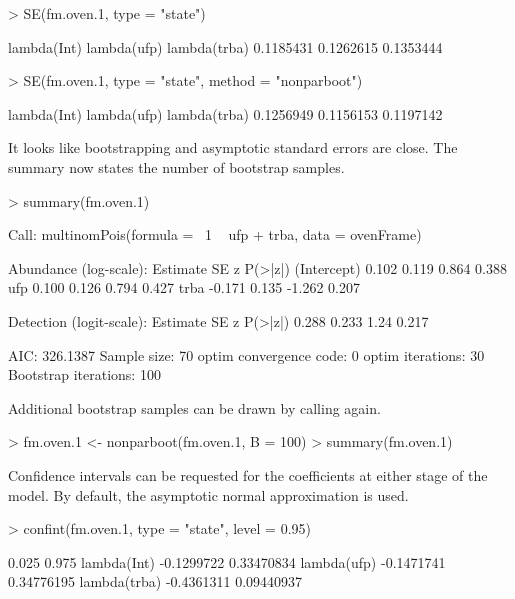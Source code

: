 \documentclass[article,shortnames]{jss}
\begin{document}
\begin{Schunk}
\begin{Sinput}
> SE(fm.oven.1, type = "state")
\end{Sinput}
\begin{Soutput}
 lambda(Int)  lambda(ufp) lambda(trba) 
   0.1185431    0.1262615    0.1353444 
\end{Soutput}
\begin{Sinput}
> SE(fm.oven.1, type = "state", method = "nonparboot")
\end{Sinput}
\begin{Soutput}
 lambda(Int)  lambda(ufp) lambda(trba) 
   0.1256949    0.1156153    0.1197142 
\end{Soutput}
\end{Schunk}

It looks like bootstrapping and asymptotic standard errors are close.
The summary now states the number of bootstrap samples.

\begin{Schunk}
\begin{Sinput}
> summary(fm.oven.1)
\end{Sinput}
\begin{Soutput}
Call:
multinomPois(formula = ~1 ~ ufp + trba, data = ovenFrame)

Abundance (log-scale):
            Estimate    SE      z P(>|z|)
(Intercept)    0.102 0.119  0.864   0.388
ufp            0.100 0.126  0.794   0.427
trba          -0.171 0.135 -1.262   0.207

Detection (logit-scale):
 Estimate    SE    z P(>|z|)
    0.288 0.233 1.24   0.217

AIC: 326.1387 
Sample size: 70
optim convergence code: 0
optim iterations: 30 
Bootstrap iterations: 100 
\end{Soutput}
\end{Schunk}

Additional bootstrap samples can be drawn by calling  again.
\begin{Schunk}
\begin{Sinput}
> fm.oven.1 <- nonparboot(fm.oven.1, B = 100)
> summary(fm.oven.1)
\end{Sinput}
\end{Schunk}

Confidence intervals can be requested for the coefficients at either
stage of the model.  By default, the asymptotic normal approximation
is used.

\begin{Schunk}
\begin{Sinput}
> confint(fm.oven.1, type = "state", level = 0.95)
\end{Sinput}
\begin{Soutput}
                  0.025      0.975
lambda(Int)  -0.1299722 0.33470834
lambda(ufp)  -0.1471741 0.34776195
lambda(trba) -0.4361311 0.09440937
\end{Soutput}
\end{Schunk}
\end{document}
